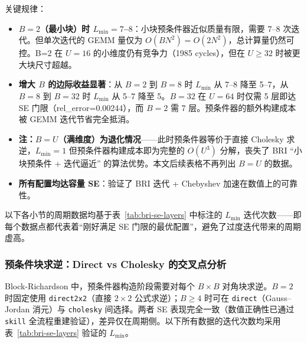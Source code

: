     关键规律：
    \begin{itemize}
        \item \textbf{$B=2$（最小块）时 $L_{\min}=7$--$8$}：小块预条件器近似质量有限，需要
            7--8 次迭代。但单次迭代的 GEMM 量仅为 $O(B N^{2})=O(2 N^{2})$，总计算量仍然可控。B=2
            在 $U=16$ 的小维度仍有竞争力（1985 cycles），但在 $U\ge32$ 时被更大块尺寸超越。

        \item \textbf{增大 $B$ 的边际收益显著}：从 $B=2$ 到 $B=8$ 时 $L_{\min}$ 从
            7--8 降至 5--7，从 $B=8$ 到 $B=32$ 时 $L_{\min}$ 从 5--7 降至 5。$B=3
            2$ 在 $U=64$ 时仅需 5 层即达 SE 门限（rel\_error=0.00244），而 $B=2$
            需 7 层。预条件器的额外构建成本被 GEMM 迭代节省完全抵消。

        \item \textbf{注：$B=U$（满维度）为退化情况}——此时预条件器等价于直接 Cholesky
            求逆，$L_{\min}=1$ 但预条件器构建成本即为完整的 $O(U^{3})$
            分解，丧失了 BRI ``小块预条件 + 迭代逼近''
            的算法优势。本文后续表格不再列出 $B=U$ 的数据。

        \item \textbf{所有配置均达容量 SE}：验证了 BRI 迭代 + Chebyshev 加速在数值上的可靠性。
    \end{itemize}

    以下各小节的周期数据均基于表~\ref{tab:bri-se-layers} 中标注的 $L_{\min}$ 迭代次数——即每个数据点都代表着“刚好满足
    SE 门限的最优配置”，避免了过度迭代带来的周期虚高。

    \subsubsection{预条件块求逆：Direct vs Cholesky 的交叉点分析}
    \label{sec:bri-precond}

    Block-Richardson 中，预条件器构造阶段需要对每个 $B\times B$ 对角块求逆。$B=2$
    时固定使用 \texttt{direct2x2}（直接 $2\times2$ 公式求逆）；$B\ge4$ 时可在 \texttt{direct}（Gauss--Jordan
    消元）与 \texttt{cholesky} 间选择。两者 SE 表现完全一致（数值正确性已通过 \texttt{skill}
    全流程重建验证），差异仅在周期侧。以下所有数据的迭代次数均采用表~\ref{tab:bri-se-layers}
    验证的 $L_{\min}$。


